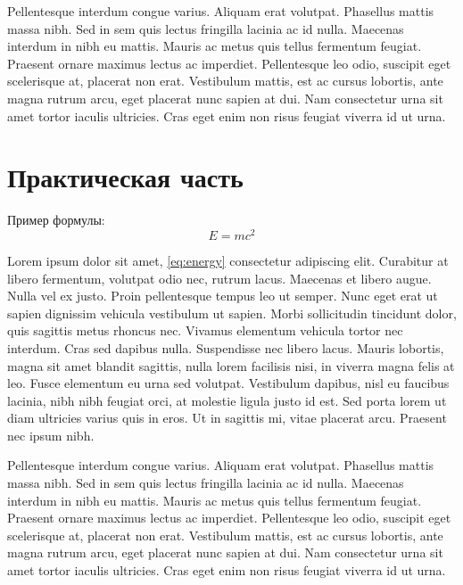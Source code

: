 Pellentesque interdum congue varius. Aliquam erat volutpat. Phasellus mattis massa nibh. Sed in sem quis lectus fringilla lacinia ac id nulla. Maecenas interdum in nibh eu mattis. Mauris ac metus quis tellus fermentum feugiat. Praesent ornare maximus lectus ac imperdiet. Pellentesque leo odio, suscipit eget scelerisque at, placerat non erat. Vestibulum mattis, est ac cursus lobortis, ante magna rutrum arcu, eget placerat nunc sapien at dui. Nam consectetur urna sit amet tortor iaculis ultricies. Cras eget enim non risus feugiat viverra id ut urna. 

\chapter{Практическая часть}

Пример формулы:
\begin{equation}
    E = mc^2
    \label{eq:energy}
\end{equation}

Lorem ipsum dolor sit amet, \eqref{eq:energy} consectetur adipiscing elit. Curabitur at libero fermentum, volutpat odio nec, rutrum lacus. Maecenas et libero augue. Nulla vel ex justo. Proin pellentesque tempus leo ut semper. Nunc eget erat ut sapien dignissim vehicula vestibulum ut sapien. Morbi sollicitudin tincidunt dolor, quis sagittis metus rhoncus nec. Vivamus elementum vehicula tortor nec interdum. Cras sed dapibus nulla. Suspendisse nec libero lacus. Mauris lobortis, magna sit amet blandit sagittis, nulla lorem facilisis nisi, in viverra magna felis at leo. Fusce elementum eu urna sed volutpat. Vestibulum dapibus, nisl eu faucibus lacinia, nibh nibh feugiat orci, at molestie ligula justo id est. Sed porta lorem ut diam ultricies varius quis in eros. Ut in sagittis mi, vitae placerat arcu. Praesent nec ipsum nibh.

Pellentesque interdum congue varius. Aliquam erat volutpat. Phasellus mattis massa nibh. Sed in sem quis lectus fringilla lacinia ac id nulla. Maecenas interdum in nibh eu mattis. Mauris ac metus quis tellus fermentum feugiat. Praesent ornare maximus lectus ac imperdiet. Pellentesque leo odio, suscipit eget scelerisque at, placerat non erat. Vestibulum mattis, est ac cursus lobortis, ante magna rutrum arcu, eget placerat nunc sapien at dui. Nam consectetur urna sit amet tortor iaculis ultricies. Cras eget enim non risus feugiat viverra id ut urna. 
